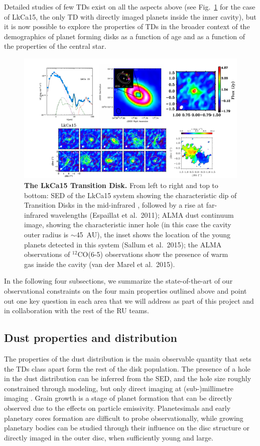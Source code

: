 \documentclass[10pt,fleqn,twoside]{article}
\begin{document}
Detailed studies of few TDs exist on all the aspects above (see Fig.~\ref{f_examples} for the case of LkCa15, the only TD with directly imaged planets inside the inner cavity), but it is now possible to explore the properties of TDs in the broader context of the demographics of planet forming disks as a function of age and as a function of the properties of the central star.  
\begin{figure}
\includegraphics[scale=0.5]{Figure_LkCa15.pdf}
\caption{{\bf The LkCa15 Transition Disk.} From left to right and top to bottom: SED of the LkCa15 system showing the characteristic dip of Transition Disks in the mid-infrared , followed by a rise at far-infrared wavelengths (Espaillat et al.~2011); ALMA dust continuum image, showing the characteristic inner hole (in this case the cavity outer radius is $\sim$45~AU), the inset shows the location of the young planets detected in this system (Sallum et al.~2015); the ALMA observations of $^{12}$CO(6-5) observations show the presence of warm gas inside the cavity (van der Marel et al.~2015).}
\label{f_examples}
\end{figure}

In the following four subsections, we summarize the state-of-the-art of our observational constraints on the four main properties outlined above and point out one key question in each area that we will address as part of this project and in collaboration with the rest of the RU teams.

\subsection{Dust properties and distribution} 
The properties of the dust distribution is the main observable quantity that sets the TDs class apart form the rest of the disk population. The presence of a hole in the dust distribution can be inferred from the SED, and the hole size roughly constrained through modeling, but only direct imaging at (sub-)millimetre imaging .
Grain growth is a stage of planet formation that can be directly observed due to the effects on particle emissivity. Planetesimals and early planetary cores formation are difficult to probe observationally, while growing planetary bodies can be studied through their influence on the disc structure or directly imaged in the outer disc, when sufficiently young and large.
\end{document}
